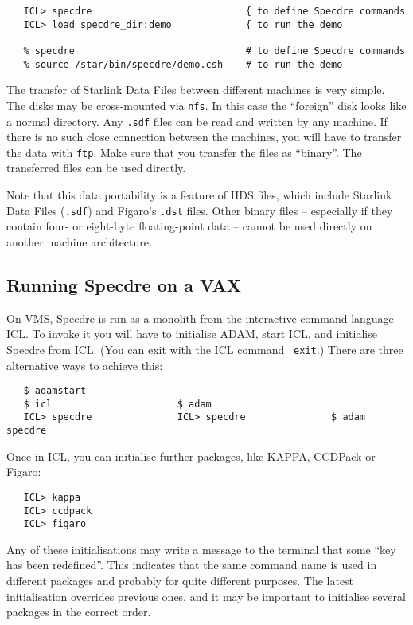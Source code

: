 \begin{verbatim}
   ICL> specdre                           { to define Specdre commands
   ICL> load specdre_dir:demo             { to run the demo

   % specdre                              # to define Specdre commands
   % source /star/bin/specdre/demo.csh    # to run the demo
\end{verbatim}

The transfer of Starlink Data Files between different machines is very simple.
The disks may be cross-mounted via {\tt nfs}. In this case the ``foreign'' disk
looks like a normal directory. Any {\tt .sdf} files can be read and written by
any machine. If there is no such close connection between the machines, you
will have to transfer the data with {\tt ftp}. Make sure that you transfer the
files as ``binary''. The transferred files can be used directly.

Note that this data portability is a feature of HDS files, which include
Starlink Data Files ({\tt .sdf}) and Figaro's {\tt .dst} files. Other binary
files -- especially if they contain four- or eight-byte floating-point data --
cannot be used directly on another machine architecture.

\goodbreak
\subsection{Running Specdre on a VAX}

On VMS, Specdre is run as a monolith from the interactive command
language ICL.  To invoke it you will have to initialise ADAM, start ICL,
and initialise Specdre from ICL. (You can exit with the ICL command {\tt
exit}.) There are three alternative ways to achieve this:

\begin{verbatim}
   $ adamstart
   $ icl                      $ adam
   ICL> specdre               ICL> specdre               $ adam specdre
\end{verbatim}

Once in ICL, you can initialise further packages, like KAPPA, CCDPack or
Figaro:

\begin{verbatim}
   ICL> kappa
   ICL> ccdpack
   ICL> figaro
\end{verbatim}

Any of these initialisations may write a message to the terminal that
some ``key has been redefined''. This indicates that the same command
name is used in different packages and probably for quite different
purposes. The latest initialisation overrides previous ones, and it may
be important to initialise several packages in the correct order.

